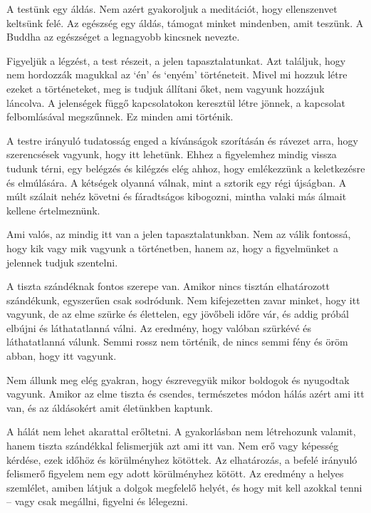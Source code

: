 A testünk egy áldás. Nem azért gyakoroljuk a meditációt, hogy
ellenszenvet keltsünk felé. Az egészség egy áldás, támogat minket
mindenben, amit teszünk. A Buddha az egészséget a legnagyobb kincsnek
nevezte.


Figyeljük a légzést, a test részeit, a jelen tapasztalatunkat. Azt
találjuk, hogy nem hordozzák magukkal az `én' és `enyém' történeteit.
Mivel mi hozzuk létre ezeket a történeteket, meg is tudjuk állítani
őket, nem vagyunk hozzájuk láncolva. A jelenségek függő kapcsolatokon
keresztül létre jönnek, a kapcsolat felbomlásával megszűnnek. Ez minden
ami történik.

A testre irányuló tudatosság enged a kívánságok szorításán és rávezet
arra, hogy szerencsések vagyunk, hogy itt lehetünk. Ehhez a figyelemhez
mindig vissza tudunk térni, egy belégzés és kilégzés elég ahhoz, hogy
emlékezzünk a keletkezésre és elmúlására. A kétségek olyanná válnak,
mint a sztorik egy régi újságban. A múlt szálait nehéz követni és
fáradtságos kibogozni, mintha valaki más álmait kellene értelmeznünk.

Ami valós, az mindig itt van a jelen tapasztalatunkban. Nem az válik
fontossá, hogy kik vagy mik vagyunk a történetben, hanem az, hogy a
figyelmünket a jelennek tudjuk szentelni.

\enlargethispage*{\baselineskip}

A tiszta szándéknak fontos szerepe van. Amikor nincs tisztán
elhatározott szándékunk, egyszerűen csak sodródunk. Nem kifejezetten
zavar minket, hogy itt vagyunk, de az elme szürke és élettelen, egy
jövőbeli időre vár, és addig próbál elbújni és láthatatlanná válni. Az
eredmény, hogy valóban szürkévé és láthatatlanná válunk. Semmi rossz nem
történik, de nincs semmi fény és öröm abban, hogy itt vagyunk.

Nem állunk meg elég gyakran, hogy észrevegyük mikor boldogok és
nyugodtak vagyunk. Amikor az elme tiszta és csendes, természetes módon
hálás azért ami itt van, és az áldásokért amit életünkben kaptunk.

A hálát nem lehet akarattal erőltetni. A gyakorlásban nem létrehozunk
valamit, hanem tiszta szándékkal felismerjük azt ami itt van. Nem erő
vagy képesség kérdése, ezek időhöz és körülményhez kötöttek. Az
elhatározás, a befelé irányuló felismerő figyelem nem egy adott
körülményhez kötött. Az eredmény a helyes szemlélet, amiben látjuk a
dolgok megfelelő helyét, és hogy mit kell azokkal tenni -- vagy csak
megállni, figyelni és lélegezni.
